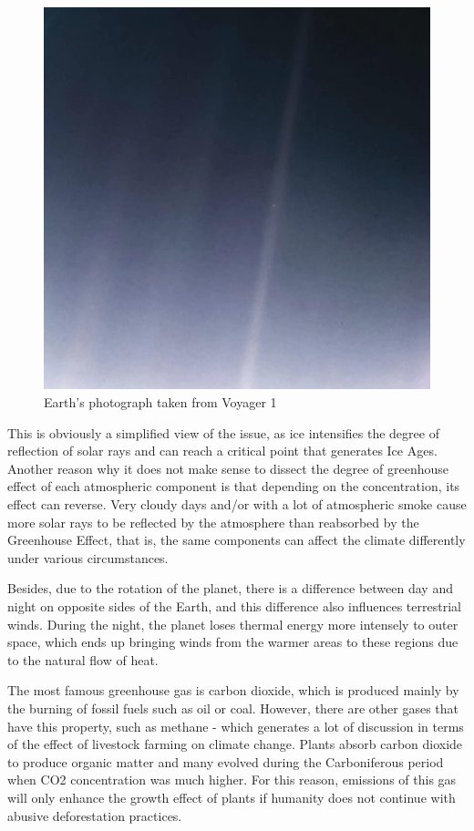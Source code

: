 \begin{figure}[ht]
    \centering
    \includegraphics[scale=0.25]{pictures/pale-blue-dot.jpg}
    \caption{Earth's photograph taken from Voyager 1}
    \label{blue-dot}
\end{figure}

This is obviously a simplified view of the issue, as ice intensifies the degree of reflection of solar rays and can reach a critical point that generates Ice Ages. Another reason why it does not make sense to dissect the degree of greenhouse effect of each atmospheric component is that depending on the concentration, its effect can reverse. Very cloudy days and/or with a lot of atmospheric smoke cause more solar rays to be reflected by the atmosphere than reabsorbed by the Greenhouse Effect, that is, the same components can affect the climate differently under various circumstances.


Besides, due to the rotation of the planet, there is a difference between day and night on opposite sides of the Earth, and this difference also influences terrestrial winds. During the night, the planet loses thermal energy more intensely to outer space, which ends up bringing winds from the warmer areas to these regions due to the natural flow of heat.

The most famous greenhouse gas is carbon dioxide, which is produced mainly by the burning of fossil fuels such as oil or coal. However, there are other gases that have this property, such as methane - which generates a lot of discussion in terms of the effect of livestock farming on climate change.
Plants absorb carbon dioxide to produce organic matter and many evolved during the Carboniferous period when CO2 concentration was much higher. For this reason, emissions of this gas will only enhance the growth effect of plants if humanity does not continue with abusive deforestation practices.

